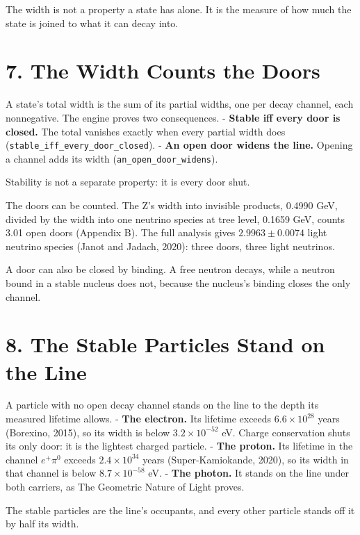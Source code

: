 \documentclass[10pt]{article}
\begin{document}
The width is not a property a state has alone. It is the measure of how
much the state is joined to what it can decay into.

\hypertarget{the-width-counts-the-doors}{%
\section{7. The Width Counts the
Doors}\label{the-width-counts-the-doors}}

A state's total width is the sum of its partial widths, one per decay
channel, each nonnegative. The engine proves two consequences. -
\textbf{Stable iff every door is closed.} The total vanishes exactly
when every partial width does
(\texttt{stable\_iff\_every\_door\_closed}). - \textbf{An open door
widens the line.} Opening a channel adds its width
(\texttt{an\_open\_door\_widens}).

Stability is not a separate property: it is every door shut.

The doors can be counted. The Z's width into invisible products, 0.4990
GeV, divided by the width into one neutrino species at tree level,
0.1659 GeV, counts 3.01 open doors (Appendix B). The full analysis gives
\(2.9963\pm0.0074\) light neutrino species (Janot and Jadach, 2020):
three doors, three light neutrinos.

A door can also be closed by binding. A free neutron decays, while a
neutron bound in a stable nucleus does not, because the nucleus's
binding closes the only channel.

\hypertarget{the-stable-particles-stand-on-the-line}{%
\section{8. The Stable Particles Stand on the
Line}\label{the-stable-particles-stand-on-the-line}}

A particle with no open decay channel stands on the line to the depth
its measured lifetime allows. - \textbf{The electron.} Its lifetime
exceeds \(6.6\times10^{28}\) years (Borexino, 2015), so its width is
below \(3.2\times10^{-52}\) eV. Charge conservation shuts its only door:
it is the lightest charged particle. - \textbf{The proton.} Its lifetime
in the channel \(e^+\pi^0\) exceeds \(2.4\times10^{34}\) years
(Super-Kamiokande, 2020), so its width in that channel is below
\(8.7\times10^{-58}\) eV. - \textbf{The photon.} It stands on the line
under both carriers, as The Geometric Nature of Light proves.

The stable particles are the line's occupants, and every other particle
stands off it by half its width.
\end{document}
